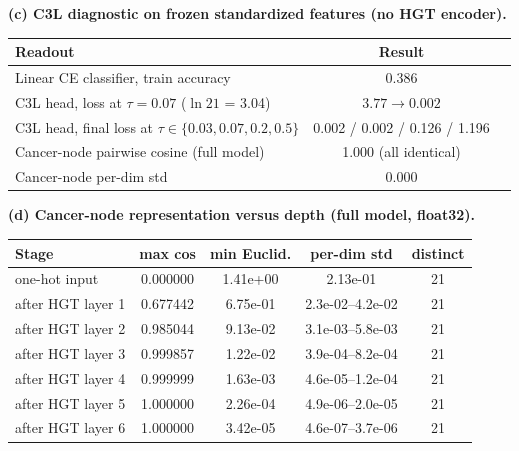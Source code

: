 \documentclass[11pt,a4paper]{article}
\begin{document}
\begin{table}[h]
\smallskip
\textbf{(c) C3L diagnostic on frozen standardized features (no HGT encoder).}
\begin{tabular}{@{}>{\raggedright\arraybackslash}p{}cc@{}}
\toprule
\textbf{Readout} & \textbf{Result} \\
\midrule
Linear CE classifier, train accuracy & 0.386 \\
C3L head, loss at $\tau=0.07$ ($\ln 21$ = 3.04) & $3.77 \to 0.002$ \\
C3L head, final loss at $\tau \in \{0.03, 0.07, 0.2, 0.5\}$ & 0.002 / 0.002 / 0.126 / 1.196 \\
Cancer-node pairwise cosine (full model) & 1.000 (all identical) \\
Cancer-node per-dim std & 0.000 \\
\bottomrule
\end{tabular}


\smallskip
\textbf{(d) Cancer-node representation versus depth (full model, float32).}
\begin{tabular}{@{}lcccc@{}}
\toprule
\textbf{Stage} & \textbf{max cos} & \textbf{min Euclid.} & \textbf{per-dim std} & \textbf{distinct} \\
\midrule
one-hot input & 0.000000 & 1.41e+00 & 2.13e-01 & 21 \\
after HGT layer 1 & 0.677442 & 6.75e-01 & 2.3e-02--4.2e-02 & 21 \\
after HGT layer 2 & 0.985044 & 9.13e-02 & 3.1e-03--5.8e-03 & 21 \\
after HGT layer 3 & 0.999857 & 1.22e-02 & 3.9e-04--8.2e-04 & 21 \\
after HGT layer 4 & 0.999999 & 1.63e-03 & 4.6e-05--1.2e-04 & 21 \\
after HGT layer 5 & 1.000000 & 2.26e-04 & 4.9e-06--2.0e-05 & 21 \\
after HGT layer 6 & 1.000000 & 3.42e-05 & 4.6e-07--3.7e-06 & 21 \\
\bottomrule
\end{tabular}


\end{table}
\end{document}
